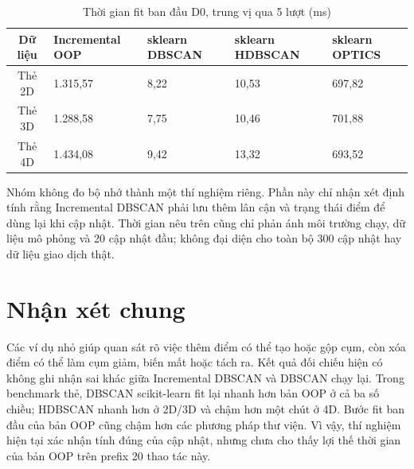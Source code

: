 \begin{table}[H]
\centering
\caption{Thời gian fit ban đầu D0, trung vị qua 5 lượt (ms)}
\label{tab:initial_fit_runtime}
\normalsize
\begin{tabularx}{\textwidth}{|c|Y|Y|Y|Y|}\hline
\textbf{Dữ liệu} & \textbf{Incremental OOP} & \textbf{sklearn DBSCAN} & \textbf{sklearn HDBSCAN} & \textbf{sklearn OPTICS} \\\hline
Thẻ 2D & 1.315,57 & 8,22 & 10,53 & 697,82 \\\hline
Thẻ 3D & 1.288,58 & 7,75 & 10,46 & 701,88 \\\hline
Thẻ 4D & 1.434,08 & 9,42 & 13,32 & 693,52 \\\hline
\end{tabularx}
\end{table}

Nhóm không đo bộ nhớ thành một thí nghiệm riêng. Phần này chỉ nhận xét định tính rằng Incremental DBSCAN phải lưu thêm lân cận và trạng thái điểm để dùng lại khi cập nhật. Thời gian nêu trên cũng chỉ phản ánh môi trường chạy, dữ liệu mô phỏng và 20 cập nhật đầu; không đại diện cho toàn bộ 300 cập nhật hay dữ liệu giao dịch thật.

\section{Nhận xét chung}

Các ví dụ nhỏ giúp quan sát rõ việc thêm điểm có thể tạo hoặc gộp cụm, còn xóa điểm có thể làm cụm giảm, biến mất hoặc tách ra. Kết quả đối chiếu hiện có không ghi nhận sai khác giữa Incremental DBSCAN và DBSCAN chạy lại. Trong benchmark thẻ, DBSCAN scikit-learn fit lại nhanh hơn bản OOP ở cả ba số chiều; HDBSCAN nhanh hơn ở 2D/3D và chậm hơn một chút ở 4D. Bước fit ban đầu của bản OOP cũng chậm hơn các phương pháp thư viện. Vì vậy, thí nghiệm hiện tại xác nhận tính đúng của cập nhật, nhưng chưa cho thấy lợi thế thời gian của bản OOP trên prefix 20 thao tác này.
